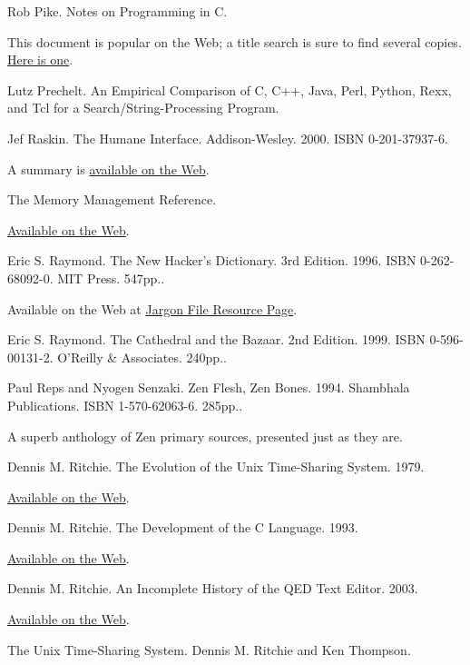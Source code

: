 \documentclass[12pt,oneside]{book}
\begin{document}
\begin{thebibliography}{9}
 Rob Pike. Notes on Programming in C.

This document is popular on the Web; a title search is sure to find several copies. \href{http://www.lysator.liu.se/c/pikestyle.html}{Here is one}.

 Lutz Prechelt. An Empirical Comparison of C, C++, Java, Perl, Python, Rexx, and Tcl for a Search/String-Processing Program.

 Jef Raskin. The Humane Interface. Addison-Wesley. 2000. ISBN 0-201-37937-6.

A summary is \href{http://humane.sourceforge.net/humane_interface/summary_of_thi.html}{available on the Web}.

 The Memory Management Reference.

\href{http://www.memorymanagement.org/}{Available on the Web}.

 Eric S. Raymond. The New Hacker's Dictionary. 3rd Edition. 1996. ISBN 0-262-68092-0. MIT Press. 547pp..

Available on the Web at \href{http://www.catb.org/~esr/jargon}{Jargon File Resource Page}.

 Eric S. Raymond. The Cathedral and the Bazaar. 2nd Edition. 1999. ISBN 0-596-00131-2. O'Reilly \&{} Associates. 240pp..

 Paul Reps and Nyogen Senzaki. Zen Flesh, Zen Bones. 1994. Shambhala Publications. ISBN 1-570-62063-6. 285pp..

A superb anthology of Zen primary sources, presented just as they are.

 Dennis M. Ritchie. The Evolution of the Unix Time-Sharing System. 1979.

\href{http://cm.bell-labs.com/cm/cs/who/dmr/hist.html}{Available on the Web}.

 Dennis M. Ritchie. The Development of the C Language. 1993.

\href{http://cm.bell-labs.com/cm/cs/who/dmr/chist.html}{Available on the Web}.

 Dennis M. Ritchie. An Incomplete History of the QED Text Editor. 2003.

\href{http://cm.bell-labs.com/cm/cs/who/dmr/qed.html}{Available on the Web}.

 The Unix Time-Sharing System. Dennis M. Ritchie and Ken Thompson.


\end{thebibliography}
\end{document}
